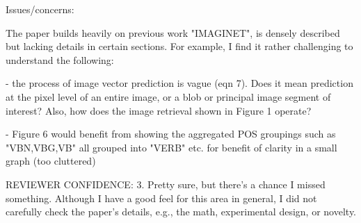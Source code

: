 \documentclass[10pt,a4paper]{letter}
\begin{document}
Issues/concerns:

The paper builds heavily on previous work "IMAGINET", is densely described
but lacking details in certain sections. For example, I find it rather
challenging to understand the following:

- the process of image vector prediction is vague (eqn 7). Does it mean
prediction at the pixel level of an entire image, or a blob or principal
image segment of interest? Also, how does the image retrieval shown in
Figure 1 operate?

- Figure 6 would benefit from showing the aggregated POS groupings such as
"VBN,VBG,VB" all grouped into "VERB" etc. for benefit of clarity in a small
graph (too cluttered)

REVIEWER CONFIDENCE:
        3. Pretty sure, but there's a chance I missed something. Although I have a
good feel for this area in general, I did not carefully check the paper's
details, e.g., the math, experimental design, or novelty.
\end{document}
